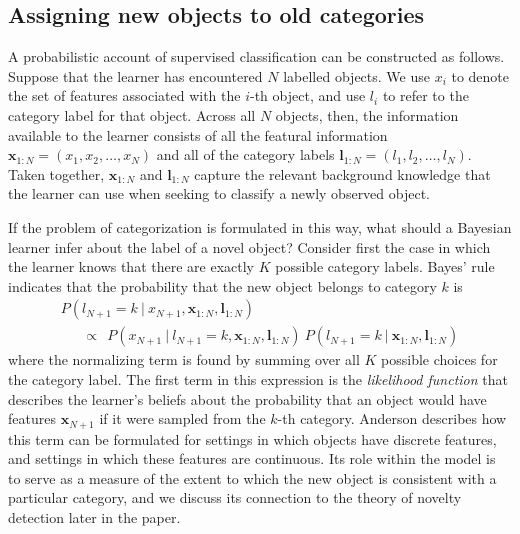 \documentclass[doc]{apa6}
\newcommand{\given}{\ | \ }
\begin{document}
\subsection{Assigning new objects to old categories}

A probabilistic account of supervised classification can be constructed as follows. Suppose that the learner has encountered $N$ labelled objects. We use $x_i$ to denote the set of features associated with the $i$-th object, and use $l_i$ to refer to the category label for that object. Across all $N$ objects, then, the information available to the learner consists of all the featural information $\bm{x}_{1:N}=(x_1, x_2, \ldots, x_N)$ and all of the category labels $\bm{l}_{1:N}=(l_1,l_2,\ldots,l_N)$. Taken together, $\bm{x}_{1:N}$ and $\bm{l}_{1:N}$ capture the relevant background knowledge that the learner can use  when seeking to classify a newly observed object.

If the problem of categorization is formulated in this way, what should a Bayesian learner infer about the label of a novel object? Consider first the case in which the learner knows that there are exactly $K$ possible category labels. Bayes' rule indicates that the probability that the new object belongs to category $k$ is
\begin{equation}
\begin{array}{l}
P(l_{N+1} = k \given x_{N+1}, \bm{x}_{1:N}, \bm{l}_{1:N})
 \\ \ \ \ \ \ \ \ \propto \ \
P(x_{N+1} \given l_{N+1} = k, \bm{x}_{1:N}, \bm{l}_{1:N}) \ P(l_{N+1} = k \given \bm{x}_{1:N}, \bm{l}_{1:N})
\end{array}
\label{basicbayes}
\end{equation}
where the normalizing term is found by summing over all $K$ possible choices for the category label. The first term in this expression is the {\it likelihood function} that describes the learner's beliefs about the probability that an object would have features $\bm{x}_{N+1}$ if it were sampled from the $k$-th category. Anderson \citeyear{anderson_adaptive_1991} describes how this term can be formulated for settings in which objects have discrete features, and settings in which these features are continuous. Its role within the model is to serve as a measure of the extent to which the new object is consistent with a particular category, and we discuss its connection to the theory of novelty detection later in the paper.
\end{document}
